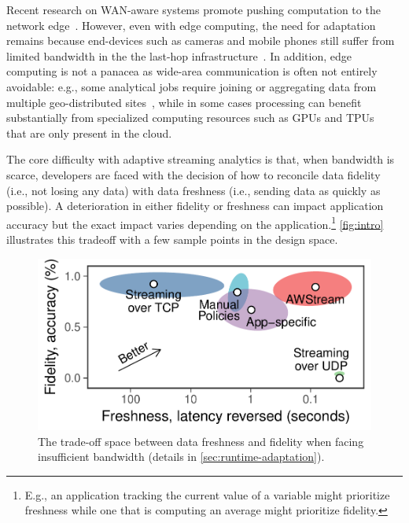 Recent research on WAN-aware systems promote pushing computation to the 
network edge~\cite{rabkin2014aggregation, satyanarayanan2009case}. 
However, even with edge computing, the need for adaptation remains because end-devices 
such as cameras and mobile phones still suffer from limited bandwidth in the the last-hop 
infrastructure~\cite{abari2017enabling, zhang2015design}.
In addition, edge computing is not a panacea as wide-area communication is often 
not entirely avoidable: e.g., some analytical jobs require joining or 
aggregating data from multiple geo-distributed sites~\cite{pu2015low, viswanathan2016clarinet}, 
while in some cases processing can benefit substantially from specialized computing 
resources such as GPUs and TPUs~\cite{abadi2016tensorflow} that are only present in the cloud.


The core difficulty with adaptive streaming analytics is that, when bandwidth is scarce, developers are faced with the decision of how to reconcile data fidelity (i.e., not losing any data) 
with data freshness (i.e., sending data as quickly as possible). A deterioration in either fidelity 
or freshness can impact application accuracy but the exact impact varies depending on the application.\footnote{E.g., an 
application tracking the current value of a variable might prioritize freshness while one that is computing an average might 
prioritize fidelity.} 
\autoref{fig:intro} illustrates this tradeoff with a few sample points in the design space.

\begin{figure}
  \centering
  \includegraphics[width=0.8\columnwidth]{figures/figure1.pdf}
  \caption{The trade-off space between data freshness and fidelity when facing
    insufficient bandwidth (details in \autoref{sec:runtime-adaptation}).}
  \label{fig:intro}
  \vspace{-0.5em}
\end{figure}

